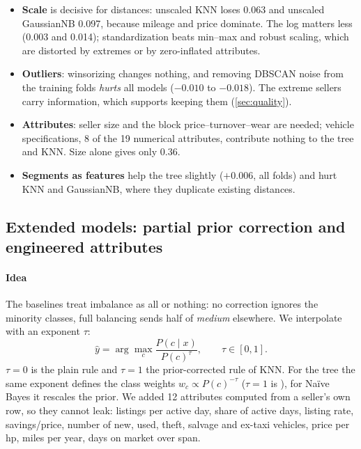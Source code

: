 \begin{itemize}
\item \textbf{Scale} is decisive for distances: unscaled KNN loses 0.063 and unscaled GaussianNB 0.097, because mileage and price dominate. The log matters less (0.003 and 0.014); standardization beats min--max and robust scaling, which are distorted by extremes or by zero-inflated attributes.
\item \textbf{Outliers}: winsorizing changes nothing, and removing DBSCAN noise from the training folds \emph{hurts} all models ($-0.010$ to $-0.018$). The extreme sellers carry information, which supports keeping them (\cref{sec:quality}).
\item \textbf{Attributes}: seller size and the block price--turnover--wear are needed; vehicle specifications, 8 of the 19 numerical attributes, contribute nothing to the tree and KNN. Size alone gives only 0.36.
\item \textbf{Segments as features} help the tree slightly ($+0.006$, all folds) and hurt KNN and GaussianNB, where they duplicate existing distances.
\end{itemize}

\subsection{Extended models: partial prior correction and engineered attributes}\label{sec:tau}
\paragraph{Idea} The baselines treat imbalance as all or nothing: no correction ignores the minority classes, full balancing sends half of \emph{medium} elsewhere. We interpolate with an exponent $\tau$:
\begin{equation}
\hat y=\arg\max_c \frac{P(c\mid x)}{P(c)^{\tau}},\qquad \tau\in[0,1].
\end{equation}
$\tau=0$ is the plain rule and $\tau=1$ the prior-corrected rule of KNN. For the tree the same exponent defines the class weights $w_c\propto P(c)^{-\tau}$ ($\tau=1$ is ), for Na\"ive Bayes it rescales the prior. We added 12 attributes computed from a seller's own row, so they cannot leak: listings per active day, share of active days, listing rate, savings/price, number of new, used, theft, salvage and ex-taxi vehicles, price per hp, miles per year, days on market over span.

